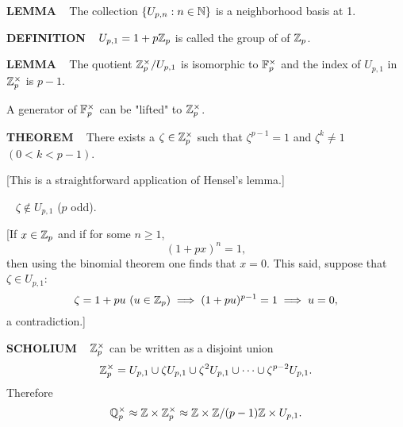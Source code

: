 \vspace{0.1cm}

\begin{x}{\small\bf LEMMA} \ %
The collection $\{U_{p,n}:n \in \mathbb{N}\}$ is a neighborhood basis at 1.\\
\end{x}

\vspace{0.1cm}

\begin{x}{\small\bf DEFINITION} \ %
$U_{p,1} = 1 + p\mathbb{Z}_p$ is called the group of 
of $\mathbb{Z}_p$.\\
\end{x}

\vspace{0.1cm}


\begin{x}{\small\bf LEMMA} \ %
The quotient $\mathbb{Z}_p^\times/U_{p,1}$ is isomorphic to $\mathbb{F}_p^\times$ and the index of $U_{p,1}$ in $\mathbb{Z}_p^\times$ is $p-1$.
\end{x}
\vspace{0.1cm}


A generator of $\mathbb{F}_p^\times$ can be "lifted" to $\mathbb{Z}_p^\times$.\\

\begin{x}{\small\bf THEOREM} \ %
There exists a $\zeta \in \mathbb{Z}_p^\times$ such that $\zeta^{p-1} = 1$ and $\zeta^k \ne 1$ $(0 < k < p-1)$.

[This is a straightforward application of Hensel's lemma.]
\end{x}

\vspace{0.1cm}

\begin{x}{\small\bf {}} \ %
$\zeta \notin U_{p,1}$ ($p$ odd).

[If $x\in \mathbb{Z}_p$ and if for some $n \ge 1$,
\[
(1 + px)^n = 1,
\]
then using the binomial theorem one finds that $x = 0$.  This said, suppose that $\zeta \in U_{p,1}$:
\[
\zeta = 1 + pu \ (u \in \mathbb{Z}_p) \implies (1 + pu)^{p-1} = 1 \implies u = 0,
\]
a contradiction.]
\end{x}

\vspace{0.1cm}

\begin{x}{\small\bf SCHOLIUM} \ %
$\mathbb{Z}_p^\times$ can be written as a disjoint union
\[
\mathbb{Z}_p^\times = U_{p,1} \cup \zeta U_{p,1} \cup \zeta^2 U_{p,1} \cup \dots \cup \zeta^{p-2}U_{p,1}.
\]
Therefore
\[
\mathbb{Q}_p^\times \approx \mathbb{Z} \times \mathbb{Z}_p^\times \approx \mathbb{Z} \times \mathbb{Z}/(p-1)\mathbb{Z} \times U_{p,1}.
\]
\end{x}

